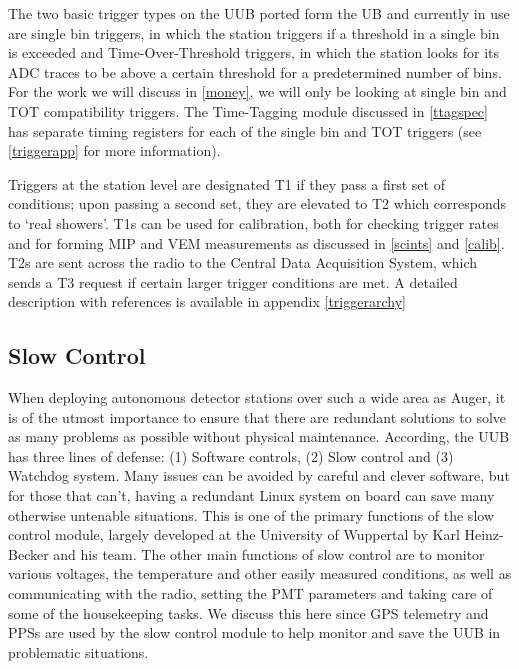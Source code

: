 The two basic trigger types on the UUB ported form the UB and currently in use are single bin triggers, in which the station triggers if a threshold in a single bin is exceeded and Time-Over-Threshold triggers, in which the station looks for its ADC traces to be above a certain threshold for a predetermined number of bins. For the work we will discuss in \autoref{money}, we will only be looking at single bin and TOT compatibility triggers. The Time-Tagging module discussed in \autoref{ttagspec} has separate timing registers for each of the single bin and TOT triggers (see \autoref{triggerapp} for more information).%

Triggers at the station level are designated T1 if they pass a first set of conditions; upon passing a second set, they are elevated to T2 which corresponds to  `real showers'. T1s can be used for calibration, both for checking trigger rates and for forming MIP and VEM measurements as discussed in \autoref{scints} and \autoref{calib}. T2s are sent across the radio to the Central Data Acquisition System, which sends a T3 request if certain larger trigger conditions are met. A detailed description with references is available in appendix \autoref{triggerarchy}

\subsection{Slow Control}
When deploying autonomous detector stations over such a wide area as Auger, it is of the utmost importance to ensure that there are redundant solutions to solve as many problems as possible without physical maintenance. According, the UUB has three lines of defense: (1) Software controls, (2) Slow control and (3) Watchdog system. Many issues can be avoided by careful and clever software, but for those that can't, having a redundant Linux system on board can save many otherwise untenable situations. This is one of the primary functions of the slow control module, largely developed at the University of Wuppertal by Karl Heinz-Becker and his team. The other main functions of slow control are to monitor various voltages, the temperature and other easily measured conditions, as well as communicating with the radio, setting the PMT parameters and taking care of some of the housekeeping tasks. We discuss this here since GPS telemetry and PPSs are used by the slow control module to help monitor and save the UUB in problematic situations.

